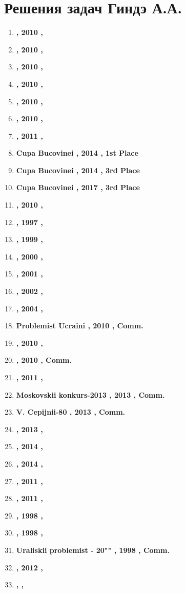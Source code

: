 \section{Решения задач Гиндэ А.А.}

\begin{enumerate}
\item \textbf{ , 2010 , }
\item \textbf{ , 2010 , }
\item \textbf{ , 2010 , }
\item \textbf{ , 2010 , }
\item \textbf{ , 2010 , }
\item \textbf{ , 2010 , }
\item \textbf{ , 2011 , }
\item \textbf{ Cupa Bucovinei , 2014 , 1st Place }
\item \textbf{ Cupa Bucovinei , 2014 , 3rd Place }
\item \textbf{ Cupa Bucovinei , 2017 , 3rd Place }
\item \textbf{ , 2010 , }
\item \textbf{ , 1997 , }
\item \textbf{ , 1999 , }
\item \textbf{ , 2000 , }
\item \textbf{ , 2001 , }
\item \textbf{ , 2002 , }
\item \textbf{ , 2004 , }
\item \textbf{ Problemist Ucraini , 2010 , Comm. }
\item \textbf{ , 2010 , }
\item \textbf{ , 2010 , Comm. }
\item \textbf{ , 2011 , }
\item \textbf{ Moskovskii konkurs-2013 , 2013 , Comm. }
\item \textbf{ V. Cepijnii-80 , 2013 , Comm. }
\item \textbf{ , 2013 , }
\item \textbf{ , 2014 , }
\item \textbf{ , 2014 , }
\item \textbf{ , 2011 , }
\item \textbf{ , 2011 , }
\item \textbf{ , 1998 , }
\item \textbf{ , 1998 , }
\item \textbf{ Uraliskii problemist - 20"" , 1998 , Comm. }
\item \textbf{ , 2012 , }
\item \textbf{ , , }

\end{enumerate}
